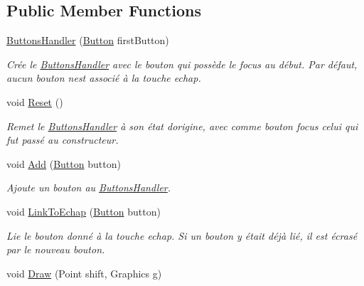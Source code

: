 \subsection*{Public Member Functions}
\begin{DoxyCompactItemize}
\item 
\hyperlink{class_tentacle_slicers_1_1hud_1_1_buttons_handler_a9f5cc9dac18041a013f0bf37d88dee25}{Buttons\+Handler} (\hyperlink{class_tentacle_slicers_1_1hud_1_1_button}{Button} first\+Button)
\begin{DoxyCompactList}\small\item\em Crée le \hyperlink{class_tentacle_slicers_1_1hud_1_1_buttons_handler}{Buttons\+Handler} avec le bouton qui possède le focus au début. Par défaut, aucun bouton n\textquotesingle{}est associé à la touche echap. \end{DoxyCompactList}\item 
void \hyperlink{class_tentacle_slicers_1_1hud_1_1_buttons_handler_a9da242600dd5a643bd3247157ef557cc}{Reset} ()
\begin{DoxyCompactList}\small\item\em Remet le \hyperlink{class_tentacle_slicers_1_1hud_1_1_buttons_handler}{Buttons\+Handler} à son état d\textquotesingle{}origine, avec comme bouton focus celui qui fut passé au constructeur. \end{DoxyCompactList}\item 
void \hyperlink{class_tentacle_slicers_1_1hud_1_1_buttons_handler_ad3a0cdf8322d6dfd4766970542fbbf53}{Add} (\hyperlink{class_tentacle_slicers_1_1hud_1_1_button}{Button} button)
\begin{DoxyCompactList}\small\item\em Ajoute un bouton au \hyperlink{class_tentacle_slicers_1_1hud_1_1_buttons_handler}{Buttons\+Handler}. \end{DoxyCompactList}\item 
void \hyperlink{class_tentacle_slicers_1_1hud_1_1_buttons_handler_afb17709bbc0a405595a61c4f2a09ad8b}{Link\+To\+Echap} (\hyperlink{class_tentacle_slicers_1_1hud_1_1_button}{Button} button)
\begin{DoxyCompactList}\small\item\em Lie le bouton donné à la touche echap. Si un bouton y était déjà lié, il est écrasé par le nouveau bouton. \end{DoxyCompactList}\item 
void \hyperlink{class_tentacle_slicers_1_1hud_1_1_buttons_handler_a4fb37b6edf1c21cbbb53a96f11c6d3cc}{Draw} (Point shift, Graphics g)

\end{DoxyCompactItemize}
